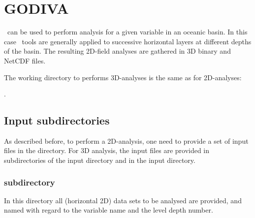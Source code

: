 \chapter{GODIVA\label{chap:godiva}}

\diva\  can be used to perform analysis  for a given variable in an oceanic basin. In this case \diva\  tools are generally applied to successive horizontal layers at different depths of the basin. The resulting 2D-field analyses are gathered in 3D binary and NetCDF files.

The working directory to performs 3D-analyses is the same as for 2D-analyses:\par {}.


\minitoc

\section{Input subdirectories}

As described before, to perform a 2D-analysis, one need to provide a set of input files in the   directory. For 3D analysis, the input files are provided in subdirectories of the input directory and in the input directory.

\subsection[DIVA3D/divastripped/input/divadata directory]{ subdirectory}

In this directory all (horizontal 2D) data sets to be analysed are provided, and named with regard to the variable name and the level depth number.


\begin{center}
\end{center}

